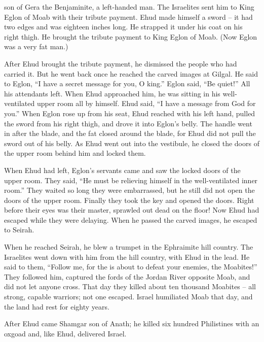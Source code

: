 {son
of Gera
the Benjaminite,
a left-handed
man.
The Israelites
sent
him to King
Eglon
of Moab
with their tribute payment.
Ehud
made
himself a sword
– it had two
edges
and was eighteen inches
long.
He strapped
it under
his coat
on
his right
thigh.
He brought
the tribute
payment to King
Eglon
of Moab.
(Now Eglon
was a very
fat
man.)
\par }{\PP {}After
Ehud
brought
the tribute
payment, he dismissed
the people
who had
carried it.
But he
went back
once he reached the carved images
at
Gilgal.
He said
to Eglon, “I have a secret
message
for
you, O king.”
Eglon said,
“Be quiet!” All
his attendants
left.
When Ehud
approached
him, he
was sitting
in his well-ventilated
upper room
all by himself.
Ehud
said,
“I have a message
from God
for
you.” When Eglon rose up
from
his seat,
Ehud
reached
with his left hand,
pulled
the sword
from
his right
thigh,
and drove
it into Eglon’s belly.
The handle
went
in after
the blade,
and the fat
closed
around
the blade,
for
Ehud did not
pull
the sword
out
of his belly.
As Ehud
went out
into the vestibule,
he closed
the doors
of the upper
room behind him and locked them.
\par }{\PP {}When Ehud had left, Eglon’s servants
came
and saw
the locked
doors
of the upper
room. They said,
“He must be relieving
himself in the well-ventilated
inner room.”
They waited
so long
they were embarrassed,
but he still
did not
open
the doors
of the upper
room. Finally they took
the
key
and opened
the doors. Right
before their eyes was their master,
sprawled
out dead
on
the floor!
Now Ehud
had escaped
while
they were delaying.
When he passed
the carved images,
he escaped
to Seirah.
\par }{\PP {}When
he reached
Seirah, he blew
a trumpet
in the Ephraimite
hill country.
The Israelites
went down
with
him from
the hill country,
with Ehud in the lead.
He said
to
them,
“Follow
me, for
the {}
is about to defeat
your enemies,
the
Moabites!” They followed
him, captured
the fords
of the Jordan River
opposite Moab,
and did not
let
anyone
cross.
That day they killed
about ten
thousand
Moabites –
all
strong, capable
warriors;
not
one escaped.
Israel
humiliated
Moab
that day,
and the land
had rest
for eighty
years.
\par }{\PP {}After
Ehud came Shamgar
son
of Anath;
he killed
six
hundred
Philistines
with an oxgoad
and, like Ehud, delivered
Israel.

}
